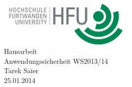 \documentclass[pdftex,fontsize=11pt,a4paper]{scrbook}
\begin{document}
\begin{titlepage}
\thispagestyle{empty}
\begin{center}
\includegraphics[width=0.5\textwidth]{hfu.png}~\\[1.5cm]
\Huge Hausarbeit\\[0.4cm]
\Huge Anwendungssicherheit WS2013/14\\[1cm]
\LARGE Tarek Saier\\[0.2cm]
\normalsize 25.01.2014
\end{center}
\end{titlepage}
\end{document}
